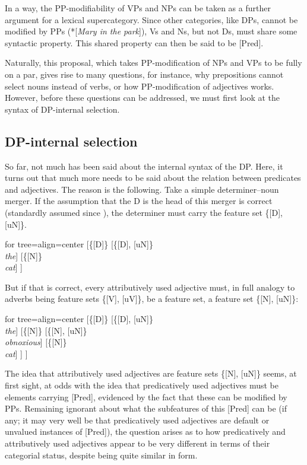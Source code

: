 \documentclass[output=paper
,modfonts
,nonflat]{langsci/langscibook}
\begin{document}
\noindent In a way, the PP-modifiability of VPs and NPs can be taken as a further argument for a lexical supercategory. Since other categories, like DPs, cannot be modified by PPs (*[\textit{Mary in the park}]), Vs and Ns, but not Ds, must share some syntactic property. This shared property can then be said to be [Pred].

Naturally, this proposal, which takes PP-modification of NPs and VPs to be fully on a par, gives rise to many questions, for instance, why prepositions cannot select nouns instead of verbs, or how PP-modification of adjectives works. However, before these questions can be addressed, we must first look at the syntax of DP-internal selection.

\subsection{DP-internal selection}
So far, not much has been said about the internal syntax of the DP. Here, it turns out that much more needs to be said about the relation between predicates and adjectives. The reason is the following. Take a simple determiner–noun merger. If the assumption that the D is the head of this merger is correct (standardly as\-sumed since \citealt{Abney1987}), the determiner must carry the feature set \{[D], [uN]\}.  

	\begin{exe}
		\ex
			\begin{forest}	for tree={align=center}
				[\{{[}D{]}\}
				[\{{[}D{]}{,} {[}uN{]}\}\\ \textit{the}]
				[\{{[}N{]}\}\\ \textit{cat}] ]
		\end{forest}
	\end{exe}
\noindent But if that is correct, every attributively used adjective must, in full analogy to adverbs being feature sets \{[V], [uV]\}, be a feature set, a feature set \{[N], [uN]\}:

	\begin{exe}
		\ex
			\begin{forest}	for tree={align=center}
				[\{{[}D{]}\}
				[\{{[}D{]}{,} {[}uN{]}\}\\ \textit{the}]
				[\{{[}N{]}\}
				[\{{[}N{]}{,} {[}uN{]}\}\\ \textit{obnoxious}]
				[\{{[}N{]}\}\\ \textit{cat}] ] ] 
		\end{forest}
	\end{exe}
\noindent The idea that attributively used adjectives are feature sets \{[N], [uN]\} seems, at first sight, at odds with the idea that predicatively used adjectives must be elements carrying [Pred], evidenced by the fact that these can be modified by PPs. Remaining ignorant about what the subfeatures of this [Pred] can be (if any; it may very well be that predicatively used adjectives are default or unvalued instances of [Pred]), the question arises as to how predicatively and attributively used adjectives appear to be very different in terms of their categorial status, despite being quite similar in form.
\end{document}
